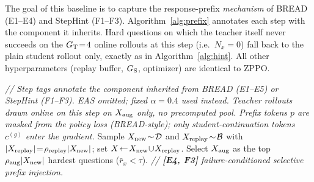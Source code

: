 The goal of this baseline is to capture the response-prefix \emph{mechanism} of BREAD (E1--E4) and StepHint (F1--F3). Algorithm~\ref{alg:prefix} annotates each step with the component it inherits. Hard questions on which the teacher itself never succeeds on the $G_{\rm T}\!=\!4$ online rollouts at this step (i.e.\ $N_x\!=\!0$) fall back to the plain student rollout only, exactly as in Algorithm~\ref{alg:hint}. All other hyperparameters (replay buffer, $G_{\rm S}$, optimizer) are identical to ZPPO.
\begin{algorithm*}[!htbp]
\SetAlgoLined
\DontPrintSemicolon
{}
\textit{// Step tags annotate the component inherited from BREAD (E1--E5) or StepHint (F1--F3). EAS omitted; fixed $\alpha\!=\!0.4$ used instead. Teacher rollouts drawn \emph{online on this step} on $X_{\rm aug}$ only, no precomputed pool. Prefix tokens $p$ are masked from the policy loss (BREAD-style); only student-continuation tokens $c^{(g)}$ enter the gradient.}\;
Sample $X_{\rm new}\!\sim\!\mathcal{D}$ and $X_{\rm replay}\!\sim\!\mathcal{B}$ with $|X_{\rm replay}|\!=\!\rho_{\rm replay}|X_{\rm new}|$; set $X\!\leftarrow\!X_{\rm new}\!\cup\!X_{\rm replay}$.\;
Select $X_{\rm aug}$ as the top $\rho_{\rm aug}|X_{\rm new}|$ hardest questions ($\bar{r}_x\!<\!\tau$). \textit{// \textbf{[E4, F3]} failure-conditioned selective prefix injection.}\;
\end{algorithm*}
